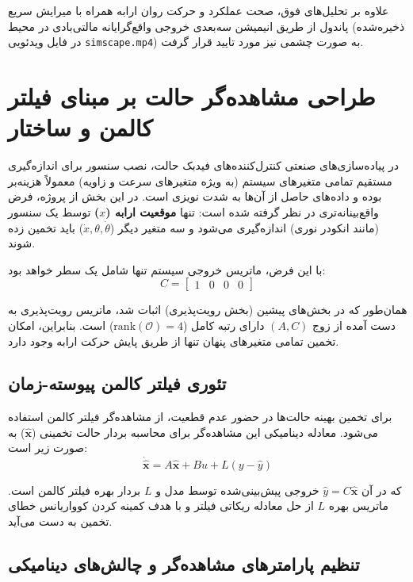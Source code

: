 \documentclass[a4paper,12pt]{article}
\begin{document}
علاوه بر تحلیل‌های فوق، صحت عملکرد و حرکت روان ارابه همراه با میرایش سریع پاندول از طریق انیمیشن سه‌بعدی خروجی واقع‌گرایانه مالتی‌بادی در محیط  (ذخیره‌شده در فایل ویدئویی \texttt{simscape.mp4}) به صورت چشمی نیز مورد تایید قرار گرفت.

\section{طراحی مشاهده‌گر حالت بر مبنای فیلتر کالمن و ساختار }
\label{sec:kalman_design}

در پیاده‌سازی‌های صنعتی کنترل‌کننده‌های فیدبک حالت، نصب سنسور برای اندازه‌گیری مستقیم تمامی متغیرهای سیستم (به ویژه متغیرهای سرعت و زاویه) معمولاً هزینه‌بر بوده و داده‌های حاصل از آن‌ها به شدت نویزی است. در این بخش از پروژه، فرض واقع‌بینانه‌تری در نظر گرفته شده است: تنها \textbf{موقعیت ارابه ($x$)} توسط یک سنسور (مانند انکودر نوری) اندازه‌گیری می‌شود و سه متغیر دیگر ($\dot{x}, \theta, \dot{\theta}$) باید تخمین زده شوند.

با این فرض، ماتریس خروجی سیستم تنها شامل یک سطر خواهد بود:
\begin{equation}
    C = \begin{bmatrix} 1 & 0 & 0 & 0 \end{bmatrix}
\end{equation}

همان‌طور که در بخش‌های پیشین (بخش رویت‌پذیری) اثبات شد، ماتریس رویت‌پذیری به دست آمده از زوج $(A, C)$ دارای رتبه کامل ($\mathrm{rank}(\mathcal{O}) = 4$) است. بنابراین، امکان تخمین تمامی متغیرهای پنهان تنها از طریق پایش حرکت ارابه وجود دارد.

\subsection{تئوری فیلتر کالمن پیوسته-زمان}

برای تخمین بهینه حالت‌ها در حضور عدم قطعیت، از مشاهده‌گر فیلتر کالمن استفاده می‌شود. معادله دینامیکی این مشاهده‌گر برای محاسبه بردار حالت تخمینی ($\hat{\mathbf{x}}$) به صورت زیر است:
\begin{equation}
    \dot{\hat{\mathbf{x}}} = A\hat{\mathbf{x}} + B u + L (y - \hat{y})
\end{equation}

که در آن $\hat{y} = C\hat{\mathbf{x}}$ خروجی پیش‌بینی‌شده توسط مدل و $L$ بردار بهره فیلتر کالمن است. ماتریس بهره $L$ از حل معادله ریکاتی فیلتر و با هدف کمینه کردن کوواریانس خطای تخمین به دست می‌آید.

\subsection{تنظیم پارامترهای مشاهده‌گر و چالش‌های دینامیکی}
\end{document}
